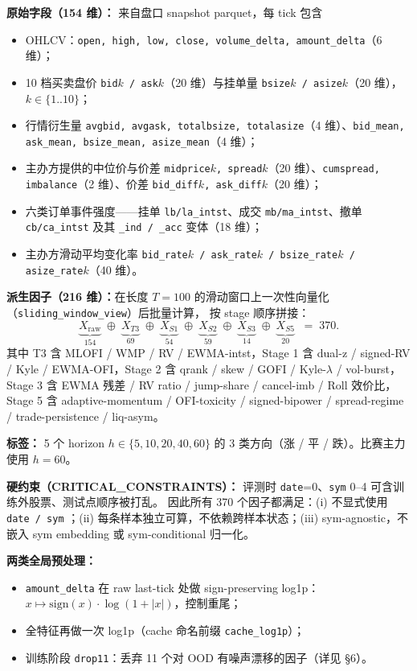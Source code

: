 \documentclass[10.5pt,a4paper]{article}
\begin{document}
\textbf{原始字段（154 维）：} 来自盘口 snapshot parquet，每 tick 包含
\begin{itemize}[leftmargin=2.2em,itemsep=2pt,topsep=2pt]
  \item OHLCV：\texttt{open, high, low, close, volume\_delta, amount\_delta}（6 维）；
  \item 10 档买卖盘价 \texttt{bid$k$ / ask$k$}（20 维）与挂单量 \texttt{bsize$k$ / asize$k$}（20 维），$k\in\{1..10\}$；
  \item 行情衍生量 \texttt{avgbid, avgask, totalbsize, totalasize}（4 维）、\texttt{bid\_mean, ask\_mean, bsize\_mean, asize\_mean}（4 维）；
  \item 主办方提供的中位价与价差 \texttt{midprice$k$, spread$k$}（20 维）、\texttt{cumspread, imbalance}（2 维）、价差 \texttt{bid\_diff$k$, ask\_diff$k$}（20 维）；
  \item 六类订单事件强度——挂单 \texttt{lb/la\_intst}、成交 \texttt{mb/ma\_intst}、撤单 \texttt{cb/ca\_intst} 及其 \texttt{\_ind / \_acc} 变体（18 维）；
  \item 主办方滑动平均变化率 \texttt{bid\_rate$k$ / ask\_rate$k$ / bsize\_rate$k$ / asize\_rate$k$}（40 维）。
\end{itemize}

\textbf{派生因子（216 维）：}在长度 $T=100$ 的滑动窗口上一次性向量化（\texttt{sliding\_window\_view}）后批量计算，
按 stage 顺序拼接：
\[
\underbrace{X_{\text{raw}}}_{154}
\;\oplus\;
\underbrace{X_{T3}}_{69}
\;\oplus\;
\underbrace{X_{S1}}_{54}
\;\oplus\;
\underbrace{X_{S2}}_{59}
\;\oplus\;
\underbrace{X_{S3}}_{14}
\;\oplus\;
\underbrace{X_{S5}}_{20}
\;\;=\; 370 .
\]
其中 T3 含 MLOFI / WMP / RV / EWMA-intst，Stage 1 含 dual-z / signed-RV / Kyle / EWMA-OFI，Stage 2 含 qrank / skew / GOFI / Kyle-$\lambda$ / vol-burst，Stage 3 含 EWMA 残差 / RV ratio / jump-share / cancel-imb / Roll 效价比，Stage 5 含 adaptive-momentum / OFI-toxicity / signed-bipower / spread-regime / trade-persistence / liq-asym。

\textbf{标签：} 5 个 horizon $h\in\{5,10,20,40,60\}$ 的 3 类方向（涨 / 平 / 跌）。比赛主力使用 $h=60$。

\textbf{硬约束（CRITICAL\_CONSTRAINTS）：} 评测时 \texttt{date}=0、\texttt{sym} 0–4 可含训练外股票、测试点顺序被打乱。
因此所有 370 个因子都满足：(i) 不显式使用 \texttt{date / sym} ；(ii) 每条样本独立可算，不依赖跨样本状态；(iii) sym-agnostic，不嵌入 sym embedding 或 sym-conditional 归一化。

\textbf{两类全局预处理：}
\begin{itemize}[leftmargin=2.2em,itemsep=1pt,topsep=2pt]
  \item \texttt{amount\_delta} 在 raw last-tick 处做 sign-preserving log1p：$x \mapsto \mathrm{sign}(x)\cdot\log(1+|x|)$，控制重尾；
  \item 全特征再做一次 log1p（cache 命名前缀 \texttt{cache\_log1p}）；
  \item 训练阶段 \texttt{drop11}：丢弃 11 个对 OOD 有噪声漂移的因子（详见 §6）。
\end{itemize}
\end{document}

